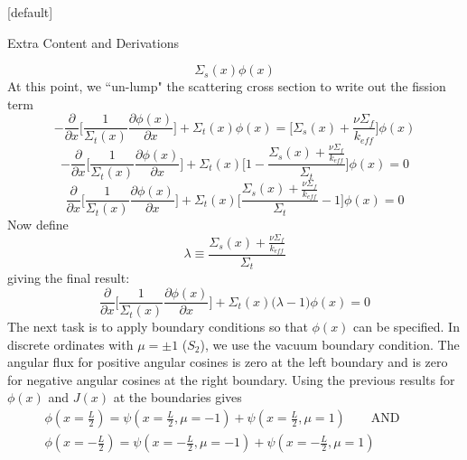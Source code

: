 \documentclass[9pt,t]{beamer}
\makeatletter
\newcommand{\QAND}{\qquad \text{AND} \qquad}
\newenvironment{withoutheadline}{
       \setbeamertemplate{headline}[default]
       \def\beamer@entrycode{\vspace*{-\headheight}}
    }{}
\makeatother
\begin{document}
\begin{withoutheadline}
\begin{frame}[allowframebreaks]{Extra Content and Derivations}
\begin{itemize}
\begin{equation}
            \Sigma_{s}(x) \phi(x)
        \end{equation}
        At this point, we ``un-lump" the scattering cross section to write out the fission term
        \begin{equation}
            -\frac{\partial}{\partial x}\bigg[\frac{1}{\Sigma_{t}(x)} \frac{\partial\phi(x)}{\partial x} \bigg] + \Sigma_{t}(x)\phi(x) =
            \bigg[\Sigma_{s}(x) + \frac{\nu \Sigma_{f}}{k_{eff}}\bigg]\phi(x)
        \end{equation}
        \begin{equation}
            -\frac{\partial}{\partial x}\bigg[\frac{1}{\Sigma_{t}(x)} \frac{\partial\phi(x)}{\partial x} \bigg] + \Sigma_{t}(x)
            \bigg[1 - \frac{\Sigma_{s}(x) + \frac{\nu \Sigma_{f}}{k_{eff}}}{\Sigma_{t}}\bigg]\phi(x) = 0
        \end{equation}
        \begin{equation}
            \frac{\partial}{\partial x}\bigg[\frac{1}{\Sigma_{t}(x)} \frac{\partial\phi(x)}{\partial x} \bigg] + \Sigma_{t}(x)
            \bigg[\frac{\Sigma_{s}(x) + \frac{\nu \Sigma_{f}}{k_{eff}}}{\Sigma_{t}} - 1\bigg]\phi(x) = 0
        \end{equation}
        Now define
        \begin{equation}
            \lambda \equiv \frac{\Sigma_{s}(x) + \frac{\nu \Sigma_{f}}{k_{eff}}}{\Sigma_{t}}
        \end{equation}
        giving the final result:
        \begin{equation}
            \frac{\partial}{\partial x}\bigg[\frac{1}{\Sigma_{t}(x)} \frac{\partial\phi(x)}{\partial x} \bigg] + \Sigma_{t}(x)
            \big(\lambda - 1\big)\phi(x) = 0
        \end{equation}
        \newpage
        The next task is to apply boundary conditions so that $\phi(x)$ can be specified. In discrete ordinates with $\mu=\pm1$ ($S_{2}$), we use the vacuum boundary condition. The angular flux for positive angular cosines is zero at the left boundary and is zero for negative angular cosines at the right boundary.
        Using the previous results for $\phi(x)$ and $J(x)$ at the boundaries gives
        \begin{multline}
            \phi(x=\frac{L}{2}) =  \psi(x=\frac{L}{2},\mu =-1) + \psi(x=\frac{L}{2},\mu =1) \QAND  \\ \phi(x=-\frac{L}{2}) =  \psi(x=-\frac{L}{2},\mu =-1) + \psi(x=-\frac{L}{2},\mu =1)
        \end{multline}

\end{itemize}
\end{frame}
\end{withoutheadline}
\end{document}
